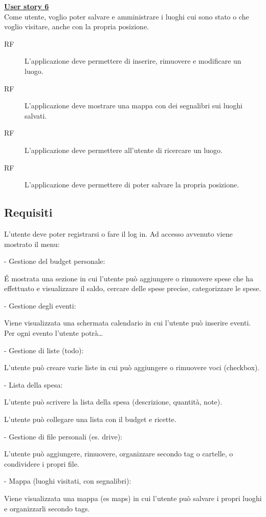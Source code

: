 \documentclass[a4paper,12pt]{article}
\begin{document}
\underline{\textbf {User story 6}} \\
Come utente, voglio poter salvare e amministrare i luoghi cui sono stato o che voglio visitare, anche con la propria posizione.
\begin{description}
\item [RF] L'applicazione deve permettere di inserire, rimuovere e modificare un luogo.
\item [RF] L'applicazione deve mostrare una mappa con dei segnalibri sui luoghi salvati.
\item [RF] L'applicazione deve permettere all'utente di ricercare un luogo.
\item [RF] L'applicazione deve permettere di poter salvare la propria posizione.
\end{description}





\subsection*{Requisiti}

L’utente deve poter registrarsi o fare il log in. Ad accesso avvenuto viene mostrato il menu:

- Gestione del budget personale:

É mostrata una sezione in cui l’utente può aggiungere o rimuovere spese che ha effettuato e visualizzare il saldo, cercare delle spese precise, categorizzare le spese.

- Gestione degli eventi:

Viene visualizzata una schermata calendario in cui l’utente può inserire eventi. Per ogni evento l’utente potrà… 

- Gestione di liste (todo):

L’utente può creare varie liste in cui può aggiungere o rimuovere voci (checkbox). 

- Lista della spesa:

L’utente può scrivere la lista della spesa (descrizione, quantità, note).

L’utente può collegare una lista con il budget e ricette.

- Gestione di file personali (es. drive):

L’utente può aggiungere, rimuovere, organizzare secondo tag o cartelle, o condividere i propri file.

- Mappa (luoghi visitati, con segnalibri):

Viene visualizzata una mappa (es maps) in cui l’utente può salvare i propri luoghi e organizzarli secondo tags.
\end{document}
